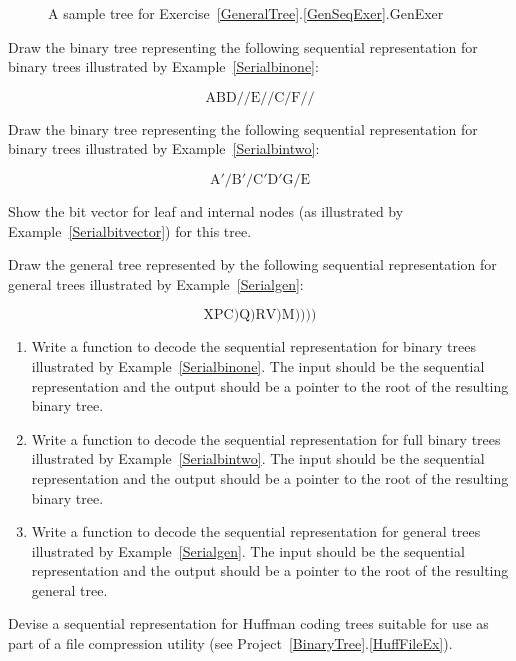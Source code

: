 \begin{exercises}
\begin{figure}
{A sample tree for
Exercise~\ref{GeneralTree}.\ref{GenSeqExer}.}{GenExer}
\end{figure}

\item
Draw the binary tree representing the following sequential
representation for binary trees illustrated by
Example~\ref{Serialbinone}:

\[ \mbox{A} \mbox{B} \mbox{D} // \mbox{E} //  \mbox{C} / \mbox{F} // \]

\item
Draw the binary tree representing the following sequential
representation for binary trees illustrated by
Example~\ref{Serialbintwo}:

\[ \mbox{A}' / \mbox{B}' / \mbox{C}' \mbox{D}' \mbox{G} / \mbox{E} \]

\noindent Show the bit vector for leaf and internal nodes (as
illustrated by Example~\ref{Serialbitvector}) for this tree.

\item
Draw the general tree represented by the following
sequential
representation for general trees illustrated by
Example~\ref{Serialgen}:

\[ \mbox{X} \mbox{P} \mbox{C}) \mbox{Q}) \mbox{R} \mbox{V}) \mbox{M})))) \]

\item
\begin{enumerate}
\item
Write a function to decode the
sequential representation for
binary trees illustrated by Example~\ref{Serialbinone}.
The input should be the sequential representation and the output
should be a pointer to the root of the resulting binary tree.

\item
Write a function to decode the sequential representation for full
binary trees illustrated by Example~\ref{Serialbintwo}.
The input should be the sequential representation and the output
should be a pointer to the root of the resulting binary tree.

\item
Write a function to decode the sequential representation for
general trees illustrated by Example~\ref{Serialgen}.
The input should be the sequential representation and the output
should be a pointer to the root of the resulting general tree.
\end{enumerate}

\item
Devise a sequential
representation for
Huffman coding
trees suitable for use as part of a file compression utility
(see Project~\ref{BinaryTree}.\ref{HuffFileEx}).

\end{exercises}

